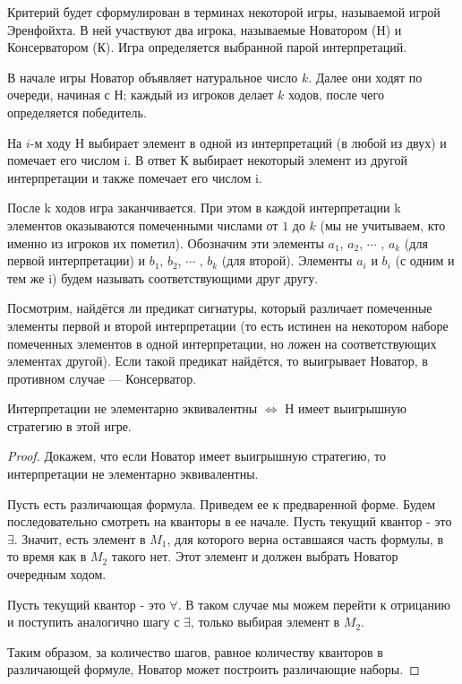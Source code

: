 \documentclass{article}
\begin{document}
Критерий будет сформулирован в терминах некоторой игры, называемой игрой Эренфойхта. В ней участвуют два игрока, называемые Новатором (Н) и Консерватором (К). Игра определяется выбранной парой интерпретаций.

В начале игры Новатор объявляет натуральное число \(k\). Далее
они ходят по очереди, начиная с Н; каждый из игроков делает \(k\) ходов, после чего определяется победитель.

На \(i\)-м ходу Н выбирает элемент в одной из интерпретаций (в
любой из двух) и помечает его числом i. В ответ К выбирает некоторый элемент из другой интерпретации и также помечает его числом i.

После k ходов игра заканчивается. При этом в каждой интерпретации k элементов оказываются помеченными числами от \(1\) до \(k\) (мы не учитываем, кто именно из игроков их пометил). Обозначим эти элементы
\(a_1\), \(a_2\), \(\cdots\) , \(a_k\) (для первой интерпретации)
и \(b_1\), \(b_2\), \(\cdots\) , \(b_k\) (для второй). Элементы \(a_i\) и \(b_i\) (с одним и тем же i) будем называть соответствующими друг другу.

Посмотрим, найдётся ли предикат сигнатуры, который различает помеченные элементы первой и второй интерпретации (то есть истинен на некотором наборе помеченных элементов в одной интерпретации, но ложен на соответствующих элементах другой). Если такой предикат найдётся, то выигрывает Новатор, в противном случае — Консерватор.

\begin{theorem}
Интерпретации не элементарно эквивалентны \(\Longleftrightarrow\) Н имеет выигрышную стратегию в этой игре.
\end{theorem}

\begin{proof}

Докажем, что если Новатор имеет выигрышную стратегию, то интерпретации не элементарно эквивалентны.

Пусть есть различающая формула. Приведем ее к предваренной форме. Будем последовательно смотреть на кванторы в ее начале. Пусть текущий квантор - это \(\exists\). Значит, есть элемент в \(M_1\), для которого верна оставшаяся часть формулы, в то время как в \(M_2\) такого нет. Этот элемент и должен выбрать Новатор очередным ходом.

Пусть текущий квантор - это \(\forall\). В таком случае мы можем перейти к отрицанию и поступить аналогично шагу с \(\exists\), только выбирая элемент в \(M_2\).

Таким образом, за количество шагов, равное количеству кванторов в различающей формуле, Новатор может построить различающие наборы.

\end{proof}
\end{document}
